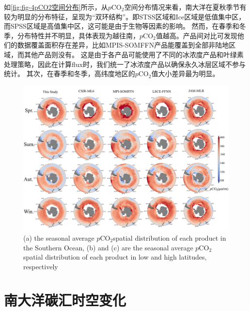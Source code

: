 如\autoref{fig:fig-4pCO2空间分布}所示，从$p\mathrm{CO_2}$空间分布情况来看，南大洋在夏秋季节有较为明显的分布特征，呈现为“双环结构”。即STSS区域和Ice区域是低值集中区，而SPSS区域是高值集中区，这可能是由于生物等因素的影响。
然而，在春季和冬季，分布特性并不明显，具体表现为越往南，$p\mathrm{CO_2}$值越高。产品间对比可发现他们的数据覆盖面积存在差异，比如MPIS-SOMFFN产品能覆盖到全部非陆地区域，而其他产品则没有。
这是由于各产品可能使用了不同的冰浓度产品和叶绿素处理策略，因此在计算flux时，我们统一了冰浓度产品以确保永久冰层区域不参与统计。
其次，在春季和冬季，高纬度地区的$p\mathrm{CO_2}$值大小差异最为明显。

\begin{figure}[htbp]
    \centering
    \includegraphics[width=\linewidth]{figure/第四章用图/图4-pCO2分布.jpg}
    {(a) the seasonal average $p\mathrm{CO_2}$spatial distribution of each product in the Southern Ocean, (b) and (c) are the seasonal average $p\mathrm{CO_2}$spatial distribution of each product in low and high latitudes, respectively}
\end{figure}

\section{南大洋碳汇时空变化}
